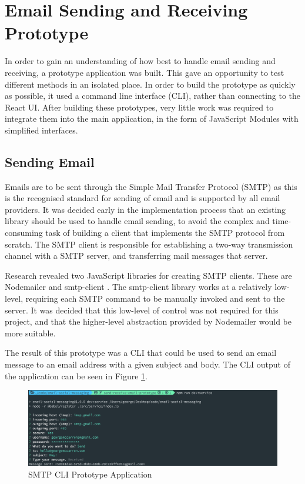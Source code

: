 \section{Email Sending and Receiving Prototype}
In order to gain an understanding of how best to handle email sending and receiving, a prototype application was built. This gave an opportunity to test different methods in an isolated place. In order to build the prototype as quickly as possible, it used a command line interface (CLI), rather than connecting to the React UI. After building these prototypes, very little work was required to integrate them into the main application, in the form of JavaScript Modules with simplified interfaces.

\subsection{Sending Email}
Emails are to be sent through the Simple Mail Transfer Protocol (SMTP) \cite{smtp-rfc} as this is the recognised standard for sending of email and is supported by all email providers. It was decided early in the implementation process that an existing library should be used to handle email sending, to avoid the complex and time-consuming task of building a client that implements the SMTP protocol from scratch. The SMTP client is responsible for establishing a two-way transmission channel with a SMTP server, and transferring mail messages that server.

Research revealed two JavaScript libraries for creating SMTP clients. These are Nodemailer \cite{nodemailer} and smtp-client \cite{smtp-client}. The smtp-client library works at a relatively low-level, requiring each SMTP command to be manually invoked and sent to the server. It was decided that this low-level of control was not required for this project, and that the higher-level abstraction provided by Nodemailer would be more suitable.

The result of this prototype was a CLI that could be used to send an email message to an email address with a given subject and body. The CLI output of the application can be seen in Figure \ref{fig:smtp-cli}.

\begin{figure}[h!]
  \centering
  \includegraphics[width=\textwidth]{images/smtp-cli.png}
  \caption{SMTP CLI Prototype Application}
  \label{fig:smtp-cli}
\end{figure}

